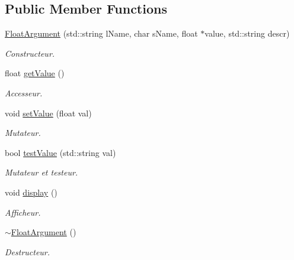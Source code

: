 \subsection*{Public Member Functions}
\begin{DoxyCompactItemize}
\item 
\hyperlink{classFloatArgument_a8d62a9520880a965646eccb244c0befb}{Float\-Argument} (std\-::string l\-Name, char s\-Name, float $\ast$value, std\-::string descr)
\begin{DoxyCompactList}\small\item\em Constructeur. \end{DoxyCompactList}\item 
float \hyperlink{classFloatArgument_a304c4a066b705321c11c522cdbf27818}{get\-Value} ()
\begin{DoxyCompactList}\small\item\em Accesseur. \end{DoxyCompactList}\item 
void \hyperlink{classFloatArgument_a3a975e03f230f16346507b90fa598ef0}{set\-Value} (float val)
\begin{DoxyCompactList}\small\item\em Mutateur. \end{DoxyCompactList}\item 
bool \hyperlink{classFloatArgument_a6456a6760c3030a7c67c688e8cde03be}{test\-Value} (std\-::string val)
\begin{DoxyCompactList}\small\item\em Mutateur et testeur. \end{DoxyCompactList}\item 
void \hyperlink{classFloatArgument_a25a6f413c78728ffb92b146dce699669}{display} ()
\begin{DoxyCompactList}\small\item\em Afficheur. \end{DoxyCompactList}\item 
\hyperlink{classFloatArgument_a6c5c8db366c42123d2b021a1cc540717}{$\sim$\-Float\-Argument} ()
\begin{DoxyCompactList}\small\item\em Destructeur. \end{DoxyCompactList}\end{DoxyCompactItemize}


